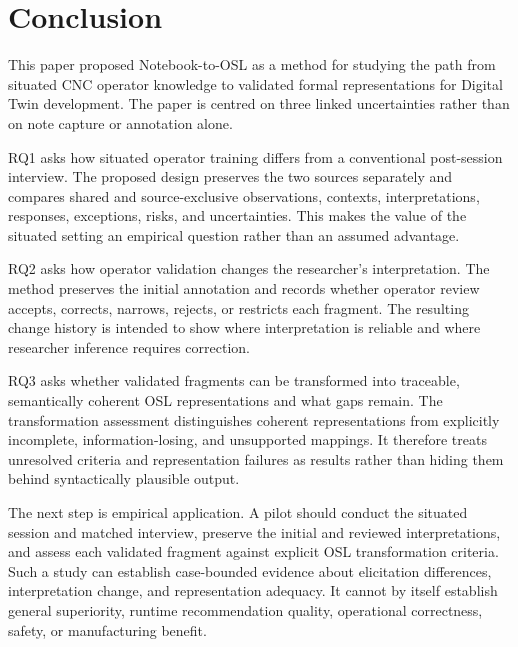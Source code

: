\section{Conclusion}
\label{sec:conclusion}

This paper proposed Notebook-to-OSL as a method for studying the path from situated CNC operator knowledge to validated formal representations for Digital Twin development. The paper is centred on three linked uncertainties rather than on note capture or annotation alone.

RQ1 asks how situated operator training differs from a conventional post-session interview. The proposed design preserves the two sources separately and compares shared and source-exclusive observations, contexts, interpretations, responses, exceptions, risks, and uncertainties. This makes the value of the situated setting an empirical question rather than an assumed advantage.

RQ2 asks how operator validation changes the researcher's interpretation. The method preserves the initial annotation and records whether operator review accepts, corrects, narrows, rejects, or restricts each fragment. The resulting change history is intended to show where interpretation is reliable and where researcher inference requires correction.

RQ3 asks whether validated fragments can be transformed into traceable, semantically coherent OSL representations and what gaps remain. The transformation assessment distinguishes coherent representations from explicitly incomplete, information-losing, and unsupported mappings. It therefore treats unresolved criteria and representation failures as results rather than hiding them behind syntactically plausible output.

The next step is empirical application. A pilot should conduct the situated session and matched interview, preserve the initial and reviewed interpretations, and assess each validated fragment against explicit OSL transformation criteria. Such a study can establish case-bounded evidence about elicitation differences, interpretation change, and representation adequacy. It cannot by itself establish general superiority, runtime recommendation quality, operational correctness, safety, or manufacturing benefit.
